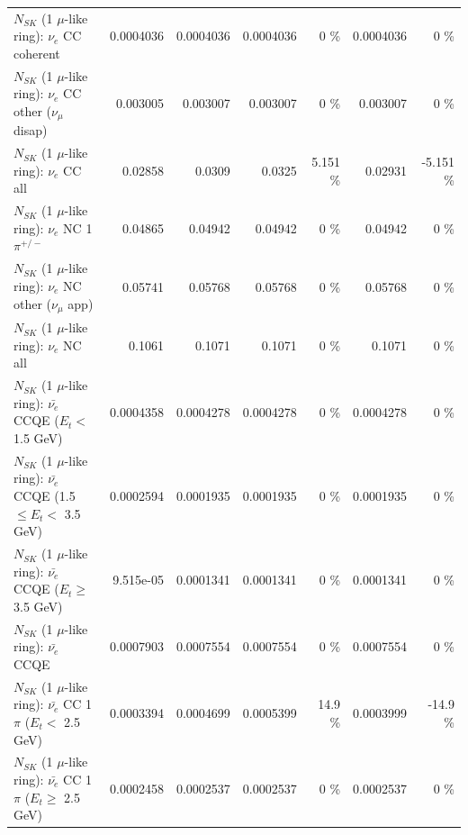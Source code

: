 \begin{table}
\begin{tabular}{| l | r | r | r  r | r  r |}
                               $N_{SK}$ (1 $\mu$-like ring): $\nu_e$ CC coherent &       0.0004036 &       0.0004036 &       0.0004036 &        0 \%  &       0.0004036 &        0 \%  \\ 
                $N_{SK}$ (1 $\mu$-like ring): $\nu_e$ CC other ($\nu_\mu$ disap) &        0.003005 &        0.003007 &        0.003007 &        0 \%  &        0.003007 &        0 \%  \\ 
                                  $N_{SK}$ (1 $\mu$-like ring): $\nu_{e}$ CC all &         0.02858 &          0.0309 &          0.0325 &    5.151 \%  &         0.02931 &   -5.151 \%  \\ 
\hline
                           $N_{SK}$ (1 $\mu$-like ring): $\nu_e$ NC 1$\pi^{+/-}$ &         0.04865 &         0.04942 &         0.04942 &        0 \%  &         0.04942 &        0 \%  \\ 
                  $N_{SK}$ (1 $\mu$-like ring): $\nu_e$ NC other ($\nu_\mu$ app) &         0.05741 &         0.05768 &         0.05768 &        0 \%  &         0.05768 &        0 \%  \\ 
                                  $N_{SK}$ (1 $\mu$-like ring): $\nu_{e}$ NC all &          0.1061 &          0.1071 &          0.1071 &        0 \%  &          0.1071 &        0 \%  \\ 
\hline
\hline
\hline
            $N_{SK}$ (1 $\mu$-like ring): $\bar{\nu_e}$ CCQE ($E_{t} <$ 1.5 GeV) &       0.0004358 &       0.0004278 &       0.0004278 &        0 \%  &       0.0004278 &        0 \%  \\ 
   $N_{SK}$ (1 $\mu$-like ring): $\bar{\nu_e}$ CCQE (1.5 $\leq E_{t} <$ 3.5 GeV) &       0.0002594 &       0.0001935 &       0.0001935 &        0 \%  &       0.0001935 &        0 \%  \\ 
         $N_{SK}$ (1 $\mu$-like ring): $\bar{\nu_e}$ CCQE ($E_{t} \geq$ 3.5 GeV) &       9.515e-05 &       0.0001341 &       0.0001341 &        0 \%  &       0.0001341 &        0 \%  \\ 
\hline
                                $N_{SK}$ (1 $\mu$-like ring): $\bar{\nu_e}$ CCQE &       0.0007903 &       0.0007554 &       0.0007554 &        0 \%  &       0.0007554 &        0 \%  \\ 
\hline
       $N_{SK}$ (1 $\mu$-like ring): $\bar{\nu_e}$ CC 1$\pi$ ($E_{t} <$ 2.5 GeV) &       0.0003394 &       0.0004699 &       0.0005399 &     14.9 \%  &       0.0003999 &    -14.9 \%  \\ 
    $N_{SK}$ (1 $\mu$-like ring): $\bar{\nu_e}$ CC 1$\pi$ ($E_{t} \geq$ 2.5 GeV) &       0.0002458 &       0.0002537 &       0.0002537 &        0 \%  &       0.0002537 &        0 \%  \\ 

\end{tabular}
\end{table}
